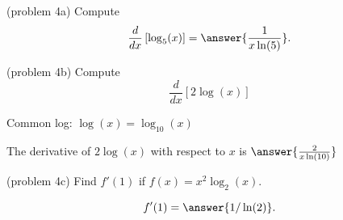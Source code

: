 \documentclass[handout]{ximera}
\begin{document}
\begin{problem}(problem 4a)
Compute
\[
\ddx \left[\log_5(x)\right] = \answer{\frac{1}{x\ln(5)}}.
\]
\end{problem}


\begin{problem}(problem 4b)
  Compute 
  \[
  \frac{d}{dx} \left[2\log(x)\right]
  \]
  
		\begin{hint}
		  Common log: $\log(x) = \log_{10}(x)$ 
		\end{hint}
	
		
		The derivative of $2\log(x)$ with respect to $x$ is
		 $\answer{\frac{2}{x\ln(10)}}$
	
\end{problem}


\begin{problem}(problem 4c)
Find $f'(1)$ if $f(x) = x^2 \log_2(x)$.

\[
f'(1) = \answer{1/\ln(2)}.
\]

\end{problem}
\end{document}
